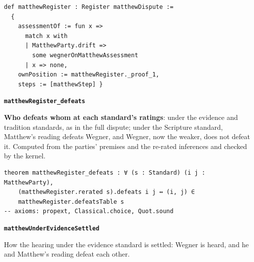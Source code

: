 \documentclass[11pt]{article}
\begin{document}
{\small\begin{verbatim}
def matthewRegister : Register matthewDispute :=
  {
    assessmentOf := fun x =>
      match x with
      | MatthewParty.drift =>
        some wegnerOnMatthewAssessment
      | x => none,
    ownPosition := matthewRegister._proof_1,
    steps := [matthewStep] }
\end{verbatim}}
\par\medskip\noindent\textbf{\texttt{matthew\allowbreak{}Register\_\allowbreak{}defeats}}\par\nobreak\noindent
\textbf{Who defeats whom at each standard’s ratings}: under the evidence and tradition standards, as in the full dispute; under the Scripture standard, Matthew’s reading defeats Wegner, and Wegner, now the weaker, does not defeat it. Computed from the parties’ premises and the re-rated inferences and checked by the kernel.

{\small\begin{verbatim}
theorem matthewRegister_defeats : ∀ (s : Standard) (i j : MatthewParty),
    (matthewRegister.rerated s).defeats i j ↔ (i, j) ∈
    matthewRegister.defeatsTable s
-- axioms: propext, Classical.choice, Quot.sound
\end{verbatim}}
\par\medskip\noindent\textbf{\texttt{matthew\allowbreak{}Under\allowbreak{}Evidence\allowbreak{}Settled}}\par\nobreak\noindent
How the hearing under the evidence standard is settled: Wegner is heard, and he and Matthew’s reading defeat each other.
\end{document}
